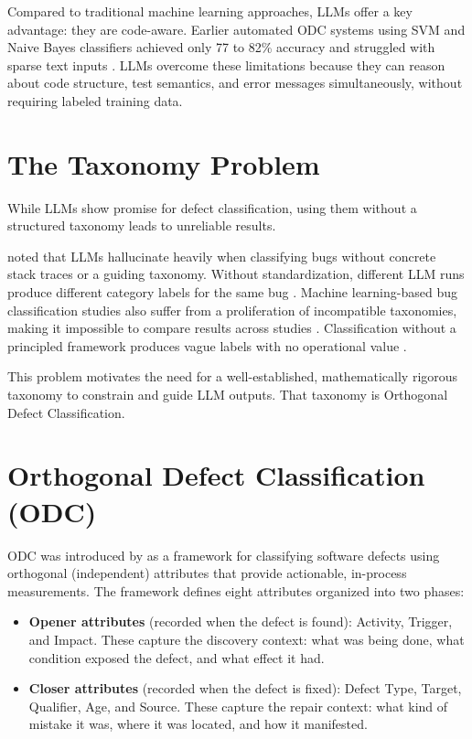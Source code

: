 \documentclass{iutbscthesis}
\begin{document}
Compared to traditional machine learning approaches, LLMs offer a key advantage: they are code-aware. Earlier automated ODC systems using SVM and Naive Bayes classifiers achieved only 77 to 82\% accuracy and struggled with sparse text inputs \cite{huang2011autoodc, thung2012automatic}. LLMs overcome these limitations because they can reason about code structure, test semantics, and error messages simultaneously, without requiring labeled training data.

\section{The Taxonomy Problem}

While LLMs show promise for defect classification, using them without a structured taxonomy leads to unreliable results.

\textcite{gao2024rcegen} noted that LLMs hallucinate heavily when classifying bugs without concrete stack traces or a guiding taxonomy. Without standardization, different LLM runs produce different category labels for the same bug \cite{koyuncu2025exploring}. Machine learning-based bug classification studies also suffer from a proliferation of incompatible taxonomies, making it impossible to compare results across studies \cite{andrade2025empirical}. Classification without a principled framework produces vague labels with no operational value \cite{thung2012automatic}.

This problem motivates the need for a well-established, mathematically rigorous taxonomy to constrain and guide LLM outputs. That taxonomy is Orthogonal Defect Classification.

\section{Orthogonal Defect Classification (ODC)}

ODC was introduced by \textcite{chillarege1992odc} as a framework for classifying software defects using orthogonal (independent) attributes that provide actionable, in-process measurements. The framework defines eight attributes organized into two phases:

\begin{itemize}
    \item \textbf{Opener attributes} (recorded when the defect is found): Activity, Trigger, and Impact. These capture the discovery context: what was being done, what condition exposed the defect, and what effect it had.
    \item \textbf{Closer attributes} (recorded when the defect is fixed): Defect Type, Target, Qualifier, Age, and Source. These capture the repair context: what kind of mistake it was, where it was located, and how it manifested.
\end{itemize}
\end{document}
